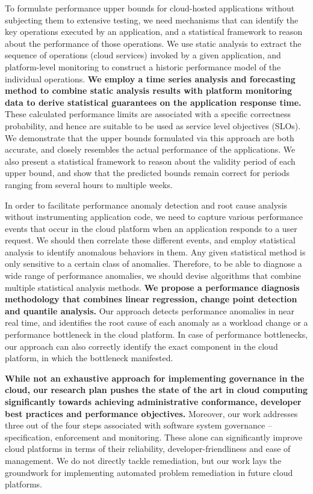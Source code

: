To formulate performance upper bounds for cloud-hosted applications without subjecting them to extensive testing,
we need mechanisms that can identify the key operations executed by an application, and a
statistical framework to reason about the performance of those operations. We use static
analysis to extract the sequence of operations (cloud services) invoked by a given application,
and platform-level monitoring to construct a historic performance model of the individual operations.
\textbf{We employ a time series analysis and forecasting method to combine static analysis results with
platform monitoring data to
derive statistical guarantees on the application response time.} These calculated performance
limits are associated with a specific correctness probability, and hence are suitable to be used
as service level objectives (SLOs). We demonstrate that the upper bounds formulated via this approach are 
both accurate, and closely resembles the actual performance of the applications. We also present a statistical framework
to reason about the validity period of each upper bound, and show that the predicted bounds
remain correct for periods ranging from several hours to multiple weeks.

In order to facilitate performance anomaly detection and root cause analysis without instrumenting
application code, we need to capture various performance events that occur in the cloud platform
when an application responds to a user request. We should then correlate these different events,
and employ statistical analysis to identify anomalous behaviors in them. Any given statistical
method is only sensitive to a certain class of anomalies. Therefore, to be able to diagnose a wide range of
performance anomalies, we should devise algorithms that combine multiple statistical analysis
methods. \textbf{We propose a performance diagnosis methodology that combines linear regression, change point
detection and quantile analysis.} Our approach detects performance anomalies in near real time,
and identifies the root cause of each anomaly as a workload change or a performance bottleneck
in the cloud platform. In case of performance bottlenecks, our approach can also correctly identify
the exact component in the cloud platform, in which the bottleneck manifested.

\textbf{While not an exhaustive approach for implementing governance in the cloud, our research plan
pushes the state of the art in cloud computing significantly towards achieving
administrative conformance, developer best practices and performance objectives.} Moreover,
our work addresses three out of the four steps associated with software system governance --
specification, enforcement and monitoring. These alone can significantly improve cloud platforms
in terms of their reliability, developer-friendliness and ease of management. 
We do not directly tackle remediation, but our work
lays the groundwork for implementing automated problem remediation in future cloud platforms.

